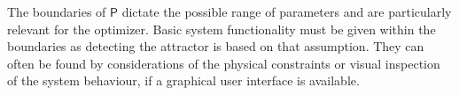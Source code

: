  






    The boundaries of $\mathsf{P}$ dictate the possible range of parameters and are particularly relevant for the optimizer. Basic system functionality must be given within the boundaries as detecting the attractor is based on that assumption. They can often be found by considerations of the physical constraints or visual inspection of the system behaviour, if a graphical user interface is available.


